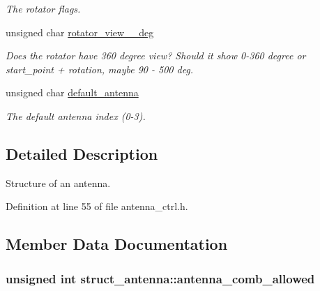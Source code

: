 \begin{CompactItemize}
\begin{CompactList}\small\item\em The rotator flags. \item\end{CompactList}\item 
\hypertarget{structstruct__antenna_9c4da4dbe80f630e9028275228c583f1}{
unsigned char \hyperlink{structstruct__antenna_9c4da4dbe80f630e9028275228c583f1}{rotator\_\-view\_\_\-deg}}
\label{structstruct__antenna_9c4da4dbe80f630e9028275228c583f1}

\begin{CompactList}\small\item\em Does the rotator have 360 degree view? Should it show 0-360 degree or start\_\-point + rotation, maybe 90 - 500 deg. \item\end{CompactList}\item 
\hypertarget{structstruct__antenna_02e6bf56c1536b921f6cb46db36308c0}{
unsigned char \hyperlink{structstruct__antenna_02e6bf56c1536b921f6cb46db36308c0}{default\_\-antenna}}
\label{structstruct__antenna_02e6bf56c1536b921f6cb46db36308c0}

\begin{CompactList}\small\item\em The default antenna index (0-3). \item\end{CompactList}\end{CompactItemize}


\subsection{Detailed Description}
Structure of an antenna. 

Definition at line 55 of file antenna\_\-ctrl.h.

\subsection{Member Data Documentation}
\hypertarget{structstruct__antenna_68cf21855c1c6f735d8b536530791f3c}{
\subsubsection[{antenna\_\-comb\_\-allowed}]{\setlength{\rightskip}{0pt plus 5cm}unsigned int {\bf struct\_\-antenna::antenna\_\-comb\_\-allowed}}}
\label{structstruct__antenna_68cf21855c1c6f735d8b536530791f3c}


